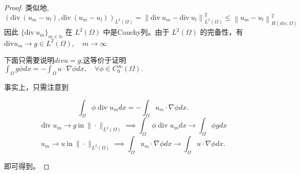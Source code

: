 \documentclass[12pt,a4paper]{article}
\begin{document}
\begin{enumerate}
\begin{proof}
			类似地,
			$$
			(\mathrm{div}\:(u_m-u_l),\mathrm{div}\:(u_m-u_l))_{L^2(\Omega)}=\left\|\mathrm{div}\:u_m-\mathrm{div}\:u_l\right\|_{L^2(\Omega)}^2\leq\left\|u_m-u_l\right\|_{H(div,\Omega)}^2
			$$
			因此 $\{\mathrm{div} \:u_m\}_{m\in\mathbb{N}}$ 在 $L^2(\Omega)$ 中是Cauchy列。由于 $L^2(\Omega)$ 的完备性，有$\mathrm{div} u_m\to g\in L^2(\Omega), \quad m\to\infty$
			
			下面只需要说明$div u = g$,这等价于证明$\int_\Omega g\phi dx=-\int_\Omega u\cdot\nabla\phi dx,\quad \forall \phi\in C_0^\infty(\Omega).$
			
			事实上，只需注意到
			
			$$\int_{\Omega}\phi\operatorname{div}u_{m} dx=-\int_{\Omega}u_{m}\cdot\nabla\phi dx.$$
			$$\operatorname{div}u_{m}\to g\mathrm{~in~}\|\cdot\|_{L^{2}(\Omega)}\implies\int_{\Omega}\phi\operatorname{div}u_{m} dx\to\int_{\Omega}\phi g dx$$
			$$u_{m}\to u\mathrm{~in~}\|\cdot\|_{L^{2}(\Omega)}\implies\int_{\Omega}u_{m}\cdot\nabla\phi dx\to\int_{\Omega}u\cdot\nabla\phi dx.$$
			
			即可得到。
		\end{proof}
		
		
	\end{enumerate}
	
	
\end{document}

